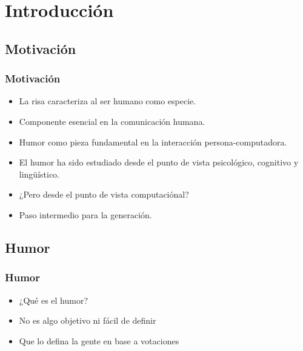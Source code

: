 \section{Introducción} 

\subsection{Motivación}

\begin{frame}[allowframebreaks]
    \frametitle{Motivación}

    \begin{itemize}
        \item La risa caracteriza al ser humano como especie.
        \item Componente esencial en la comunicación humana.
        \item Humor como pieza fundamental en la interacción persona-computadora.
    \end{itemize}

    \framebreak
    
    \begin{itemize}
        \item El humor ha sido estudiado desde el punto de vista psicológico, cognitivo y lingüístico.
        \item ¿Pero desde el punto de vista computaciónal?
        \item Paso intermedio para la generación.
    \end{itemize}
    
\end{frame}

\subsection{Humor}

\begin{frame}
    \frametitle{Humor}

    \begin{itemize}[<+->]
        \item ¿Qué es el humor?
        \item No es algo objetivo ni fácil de definir
        \item Que lo defina la gente en base a votaciones
    \end{itemize}
\end{frame}

